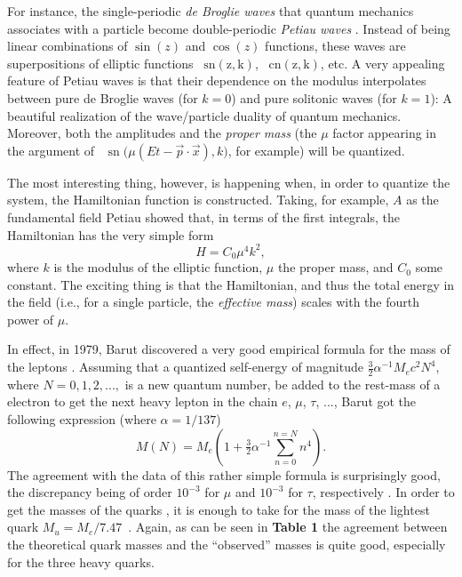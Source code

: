 \documentclass [12pt,a4paper      ]{article}
\begin{document}
     For  instance,  the  single-periodic \emph{de Broglie  waves} that 
quantum  mechanics associates with a particle become double-periodic
\emph{Petiau waves} \cite{R40}.  Instead of being linear 
combinations 
of $\sin(z)$ and $\cos(z)$ functions,  these  waves are  superpositions 
of  elliptic functions ~$\operatorname{sn(z,k)}$,  ~$\operatorname{cn(z,k)}$,  etc.  A very appealing 
feature  of Petiau waves is that their dependence on the  modulus 
interpolates  between  pure de Broglie waves (for $k=0$)  and  pure 
solitonic  waves  (for $k=1$):  A  beautiful  realization  of  the 
wave/particle duality of quantum mechanics.  Moreover,  both  the 
amplitudes  and  the \emph{proper mass} (the $\mu$ factor appearing  in  the 
argument of  ~$\operatorname{sn} \bigl(\mu(Et-\vec{p}\cdot\vec{x}),k\bigr)$, for example) will be quantized.

     The most interesting thing,  however,  is happening when, in 
order  to  quantize  the  system,  the  Hamiltonian  function  is 
constructed.   Taking,  for  example, $A$ as the fundamental field 
Petiau  showed that,  in terms of the first  integrals,  the 
Hamiltonian has the very simple form \cite{R39}
%
\begin{equation}\label{E52}
                           H = C_0 \mu^4 k^2,              %
\end{equation}
%
where $k$ is the modulus of the elliptic function, $\mu$ the  proper 
mass,  and $C_0$ some constant.   The exciting thing  is  that  the 
Hamiltonian,  and thus the total energy in the field (i.e., for a 
single particle, the \emph{effective mass}) scales with the fourth power 
of $\mu$.

     In  effect,  in  1979,  Barut  discovered a  very  good 
empirical formula for the mass of the leptons \cite{R41}.  Assuming that a 
quantized self-energy of magnitude  $\frac{3}{2} \alpha^{-1} M_e c^2 N^4$, where 
$N = 0, 1, 2, ...,$  is  a new quantum number,  be added to the rest-mass  of a 
electron  to  get the next heavy lepton in  the  chain  $e$, $\mu$, 
$\tau$, ..., Barut got the following expression (where $\alpha = 1/137$)
%
\begin{equation}\label{E53}
 M(N)= M_e (1+\tfrac{3}{2}\alpha^{-1} \sum_{n=0}^{n=N} n^4). %
\end{equation}
%
The  agreement   with the data of this rather simple  formula  is 
surprisingly good, the discrepancy being of order $10^{-3}$ for $\mu$ and 
$10^{-3}$  for $\tau$,  respectively \cite{R42}.   In order to get the masses of 
the  quarks  \cite{R43},  it  is enough to take for  the  mass  of  the 
lightest quark $M_u = M_e/7.47$~. Again, as can be seen in {\bf Table 1} the
agreement between the theoretical quark masses and the ``observed'' 
masses is quite good, especially for the three heavy quarks.
\end{document}
